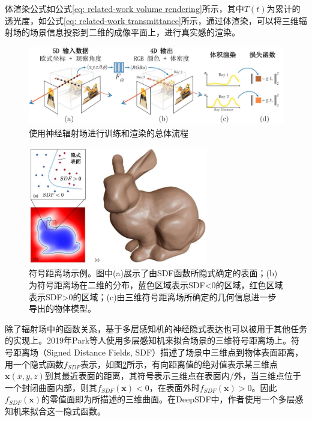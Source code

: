 体渲染公式如公式\ref{eq: related-work volume rendering}所示，其中$T(t)$为累计的透光度，如公式\ref{eq: related-work transmittance}所示，通过体渲染，可以将三维辐射场的场景信息投影到二维的成像平面上，进行真实感的渲染。


\begin{figure}[t]
    \centering
    \includegraphics[width=\textwidth]{undergraduate-thesis/images/related-work/NeRF method.pdf}
    \caption{使用神经辐射场\cite{mildenhall_nerf_2020}进行训练和渲染的总体流程}
    \label{fig:related-work NeRF pipeline}
\end{figure}

\begin{figure}[ht]
    \centering
    \includegraphics[width=0.7\textwidth]{undergraduate-thesis/images/related-work/SDF concept.pdf}
    \caption{符号距离场示例。图中(a)展示了由SDF函数所隐式确定的表面；(b)为符号距离场在二维的分布，蓝色区域表示SDF<0的区域，红色区域表示SDF>0的区域；(c)由三维符号距离场所确定的几何信息进一步导出的物体模型。}
    \label{fig:related-work SDF concept}
\end{figure}

除了辐射场中的函数关系，基于多层感知机的神经隐式表达也可以被用于其他任务的实现上\cite{park_deepsdf_2019, mescheder_occupancy_2019, shim_snerl_2023, zhi_-place_2021}。2019年Park等人使用多层感知机来拟合场景的三维符号距离场上。符号距离场（Signed Distance Fields, SDF）描述了场景中三维点到物体表面距离，用一个隐式函数$f_{SDF}$表示，如图\ref{fig:related-work SDF concept}所示，有向距离值的绝对值表示某三维点$\mathbf{x}(x,y,z)$到其最近表面的距离，其符号表示三维点在表面内/外，当三维点位于一个封闭曲面内部，则其$f_{SDF}(\mathbf{x}) < 0$，在表面外时$f_{SDF}(\mathbf{x}) > 0$。因此$f_{SDF}(\mathbf{x})$的零值面即为所描述的三维曲面。在DeepSDF中，作者使用一个多层感知机来拟合这一隐式函数。

